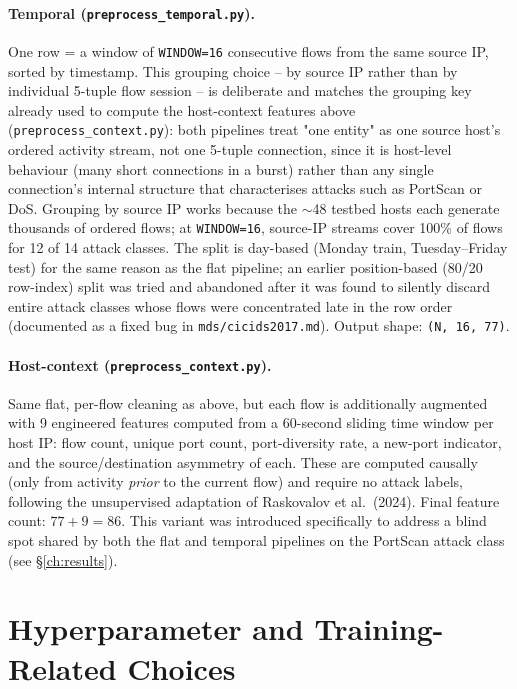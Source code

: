 \paragraph{Temporal (\texttt{preprocess\_temporal.py}).} One row = a window of \texttt{WINDOW=16} consecutive flows from the same source IP, sorted by timestamp. This grouping choice -- by source IP rather than by individual 5-tuple flow session -- is deliberate and matches the grouping key already used to compute the host-context features above (\texttt{preprocess\_context.py}): both pipelines treat "one entity" as one source host's ordered activity stream, not one 5-tuple connection, since it is host-level behaviour (many short connections in a burst) rather than any single connection's internal structure that characterises attacks such as PortScan or DoS. Grouping by source IP works because the $\sim$48 testbed hosts each generate thousands of ordered flows; at \texttt{WINDOW=16}, source-IP streams cover 100\% of flows for 12 of 14 attack classes. The split is day-based (Monday train, Tuesday--Friday test) for the same reason as the flat pipeline; an earlier position-based (80/20 row-index) split was tried and abandoned after it was found to silently discard entire attack classes whose flows were concentrated late in the row order (documented as a fixed bug in \texttt{mds/cicids2017.md}). Output shape: \texttt{(N, 16, 77)}.

\paragraph{Host-context (\texttt{preprocess\_context.py}).} Same flat, per-flow cleaning as above, but each flow is additionally augmented with 9 engineered features computed from a 60-second sliding time window per host IP: flow count, unique port count, port-diversity rate, a new-port indicator, and the source/destination asymmetry of each. These are computed causally (only from activity \emph{prior} to the current flow) and require no attack labels, following the unsupervised adaptation of Raskovalov et al.\ (2024). Final feature count: $77 + 9 = 86$. This variant was introduced specifically to address a blind spot shared by both the flat and temporal pipelines on the PortScan attack class (see \S\ref{ch:results}).

\section{Hyperparameter and Training-Related Choices}
\label{sec:architecture}

